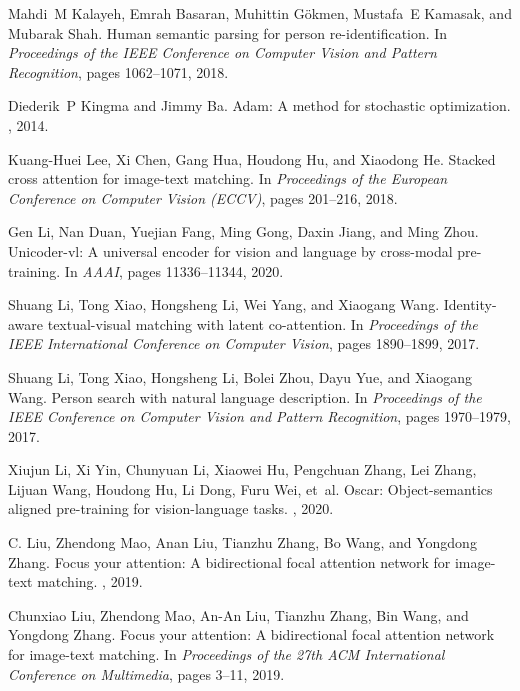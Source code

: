 \documentclass[final]{cvpr}
\begin{document}
\begin{thebibliography}{10}
Mahdi~M Kalayeh, Emrah Basaran, Muhittin G{\"o}kmen, Mustafa~E Kamasak, and
  Mubarak Shah.
\newblock Human semantic parsing for person re-identification.
\newblock In {\em Proceedings of the IEEE Conference on Computer Vision and
  Pattern Recognition}, pages 1062--1071, 2018.

Diederik~P Kingma and Jimmy Ba.
\newblock Adam: A method for stochastic optimization.
, 2014.

Kuang-Huei Lee, Xi Chen, Gang Hua, Houdong Hu, and Xiaodong He.
\newblock Stacked cross attention for image-text matching.
\newblock In {\em Proceedings of the European Conference on Computer Vision
  (ECCV)}, pages 201--216, 2018.

Gen Li, Nan Duan, Yuejian Fang, Ming Gong, Daxin Jiang, and Ming Zhou.
\newblock Unicoder-vl: A universal encoder for vision and language by
  cross-modal pre-training.
\newblock In {\em AAAI}, pages 11336--11344, 2020.

Shuang Li, Tong Xiao, Hongsheng Li, Wei Yang, and Xiaogang Wang.
\newblock Identity-aware textual-visual matching with latent co-attention.
\newblock In {\em Proceedings of the IEEE International Conference on Computer
  Vision}, pages 1890--1899, 2017.

Shuang Li, Tong Xiao, Hongsheng Li, Bolei Zhou, Dayu Yue, and Xiaogang Wang.
\newblock Person search with natural language description.
\newblock In {\em Proceedings of the IEEE Conference on Computer Vision and
  Pattern Recognition}, pages 1970--1979, 2017.

Xiujun Li, Xi Yin, Chunyuan Li, Xiaowei Hu, Pengchuan Zhang, Lei Zhang, Lijuan
  Wang, Houdong Hu, Li Dong, Furu Wei, et~al.
\newblock Oscar: Object-semantics aligned pre-training for vision-language
  tasks.
, 2020.

C. Liu, Zhendong Mao, Anan Liu, Tianzhu Zhang, Bo Wang, and Yongdong Zhang.
\newblock Focus your attention: A bidirectional focal attention network for
  image-text matching.
, 2019.

Chunxiao Liu, Zhendong Mao, An-An Liu, Tianzhu Zhang, Bin Wang, and Yongdong
  Zhang.
\newblock Focus your attention: A bidirectional focal attention network for
  image-text matching.
\newblock In {\em Proceedings of the 27th ACM International Conference on
  Multimedia}, pages 3--11, 2019.


\end{thebibliography}
\end{document}
